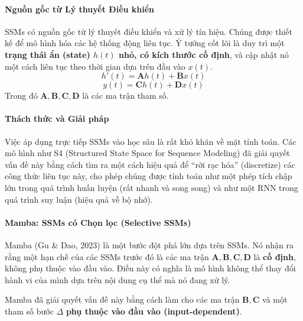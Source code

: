 \paragraph{Nguồn gốc từ Lý thuyết Điều khiển}
SSMs có nguồn gốc từ lý thuyết điều khiển và xử lý tín hiệu. Chúng được thiết kế để mô hình hóa các hệ thống động liên tục. Ý tưởng cốt lõi là duy trì một \textbf{trạng thái ẩn (state) $h(t)$ nhỏ, có kích thước cố định}, và cập nhật nó một cách liên tục theo thời gian dựa trên đầu vào $x(t)$.
$$ h'(t) = \mathbf{A}h(t) + \mathbf{B}x(t) $$
$$ y(t) = \mathbf{C}h(t) + \mathbf{D}x(t) $$
Trong đó $\mathbf{A, B, C, D}$ là các ma trận tham số.

\paragraph{Thách thức và Giải pháp}
Việc áp dụng trực tiếp SSMs vào học sâu là rất khó khăn về mặt tính toán. Các mô hình như S4 (Structured State Space for Sequence Modeling) \cite{gu2021efficiently} đã giải quyết vấn đề này bằng cách tìm ra một cách hiệu quả để “rời rạc hóa” (discretize) các công thức liên tục này, cho phép chúng được tính toán như một phép tích chập lớn trong quá trình huấn luyện (rất nhanh và song song) và như một RNN trong quá trình suy luận (hiệu quả về bộ nhớ).

\paragraph{Mamba: SSMs có Chọn lọc (Selective SSMs)}
Mamba (Gu \& Dao, 2023) \cite{gu2023mamba} là một bước đột phá lớn dựa trên SSMs. Nó nhận ra rằng một hạn chế của các SSMs trước đó là các ma trận $\mathbf{A, B, C, D}$ là \textbf{cố định}, không phụ thuộc vào đầu vào. Điều này có nghĩa là mô hình không thể thay đổi hành vi của mình dựa trên nội dung cụ thể mà nó đang xử lý.

Mamba đã giải quyết vấn đề này bằng cách làm cho các ma trận $\mathbf{B, C}$ và một tham số bước $\Delta$ \textbf{phụ thuộc vào đầu vào (input-dependent)}.

